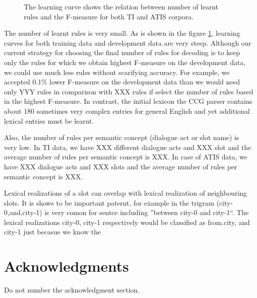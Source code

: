 \documentclass[11pt]{article}
\newcommand{\efgr}[2]{
  \begin{figure}[htbp]
    \makebox[8.5cm]{\framebox[5cm]{\rule{0pt}{5cm}}}
    \caption{#2}
    \label{#1}
  \end{figure}
}
\begin{document}
\efgr{fig:learning:curve}{The learning curve shows the relation between number of learnt rules and the F-measure for both TI and ATIS corpora.}

The number of learnt rules is very small. As is shown in the figure \ref{fig:learning:curve}, learning curves for both training data and development data are very steep. Although our current strategy for choosing the final number of rules for decoding is to keep only the rules for which we obtain highest F-measure on the development data, we could use much less rules without scarifying accuracy. For example, we accepted 0.1\% lower F-measure on the development data than we would need only YYY rules in comparison with XXX rules if select the number of rules based in the highest F-measure. In contrast, the initial lexicon the CCG parser \cite{zettlemoyer07} contains about 180 sometimes very complex entries for general English and yet additional lexical entries must be learnt.

Also, the number of rules per semantic concept (dialogue act or slot name) is very low. In TI data, we have XXX different dialogue acts and XXX slot and the average number of rules per semantic concept is XXX. In case of ATIS data, we have XXX dialogue acts and XXX slots and the average number of rules per semantic concept is XXX.

Lexical realizations of a slot can overlap with lexical realization of neighbouring slots. It is shows to be important paternt, for example in the trigram (city-0,and,city-1) is very comon for sentce including ''between city-0 and city-1``. The lexical realizations city-0, city-1 respectively would be classified as from.city, and city-1 just becasue we know the  

\section*{Acknowledgments}

Do not number the acknowledgment section.
\end{document}
